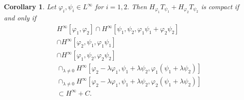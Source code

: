 \documentclass{article}%
\newtheorem{corollary}[theorem]{Corollary}
\begin{document}
\begin{corollary}
\label{cor2} Let $\varphi_{i},\psi_{i}\in L^{\infty}$ for $i=1,2.$ Then
$H_{\varphi_{1}}T_{\psi_{1}}+H_{\varphi_{2}}T_{\psi_{2}}$ is compact if and
only if
\begin{align}
&  H^{\infty}\left[  \varphi_{1},\varphi_{2}\right]  \cap H^{\infty}\left[
\psi_{1},\psi_{2},\varphi_{1}\psi_{1}+\varphi_{2}\psi_{2}\right]
\label{line1}\\
&  \cap H^{\infty}\left[  \varphi_{2},\psi_{1},\varphi_{1}\psi_{1}\right]
\label{line-1}\\
&  \cap H^{\infty}\left[  \varphi_{1},\psi_{2},\varphi_{2}\psi_{2}\right]
\label{line0}\\
&  \cap_{\lambda\neq0}H^{\infty}\left[  \varphi_{2}-\lambda\varphi_{1}%
,\psi_{1}+\lambda\psi_{2},\varphi_{1}\left(  \psi_{1}+\lambda\psi_{2}\right)
\right] \label{line2}\\
&  \cap_{\lambda\neq0}H^{\infty}\left[  \varphi_{2}-\lambda\varphi_{1}%
,\psi_{1}+\lambda\psi_{2},\varphi_{2}\left(  \psi_{1}+\lambda\psi_{2}\right)
\right] \label{line3}\\
&  \subset H^{\infty}+C.\nonumber
\end{align}

\end{corollary}
\end{document}
